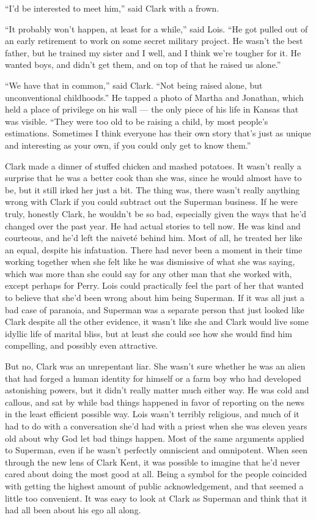 ``I'd be interested to meet him,'' said Clark with a frown.

``It probably won't happen, at least for a while,'' said Lois. ``He got
pulled out of an early retirement to work on some secret military
project. He wasn't the best father, but he trained my sister and I well,
and I think we're tougher for it. He wanted boys, and didn't get them,
and on top of that he raised us alone.''

``We have that in common,'' said Clark. ``Not being raised alone, but
unconventional childhoods.'' He tapped a photo of Martha and Jonathan,
which held a place of privilege on his wall --- the only piece of his
life in Kansas that was visible. ``They were too old to be raising a
child, by most people's estimations. Sometimes I think everyone has
their own story that's just as unique and interesting as your own, if
you could only get to know them.''

Clark made a dinner of stuffed chicken and mashed potatoes. It wasn't
really a surprise that he was a better cook than she was, since he would
almost have to be, but it still irked her just a bit. The thing was,
there wasn't really anything wrong with Clark if you could subtract out
the Superman business. If he were truly, honestly Clark, he wouldn't be
so bad, especially given the ways that he'd changed over the past year.
He had actual stories to tell now. He was kind and courteous, and he'd
left the naiveté behind him. Most of all, he treated her like an equal,
despite his infatuation. There had never been a moment in their time
working together when she felt like he was dismissive of what she was
saying, which was more than she could say for any other man that she
worked with, except perhaps for Perry. Lois could practically feel the
part of her that wanted to believe that she'd been wrong about him being
Superman. If it was all just a bad case of paranoia, and Superman was a
separate person that just looked like Clark despite all the other
evidence, it wasn't like she and Clark would live some idyllic life of
marital bliss, but at least she could see how she would find him
compelling, and possibly even attractive.

But no, Clark was an unrepentant liar. She wasn't sure whether he was an
alien that had forged a human identity for himself or a farm boy who had
developed astonishing powers, but it didn't really matter much either
way. He was cold and callous, and sat by while bad things happened in
favor of reporting on the news in the least efficient possible way. Lois
wasn't terribly religious, and much of it had to do with a conversation
she'd had with a priest when she was eleven years old about why God let
bad things happen. Most of the same arguments applied to Superman, even
if he wasn't perfectly omniscient and omnipotent. When seen through the
new lens of Clark Kent, it was possible to imagine that he'd never cared
about doing the most good at all. Being a symbol for the people
coincided with getting the highest amount of public acknowledgement, and
that seemed a little too convenient. It was easy to look at Clark as
Superman and think that it had all been about his ego all along.

